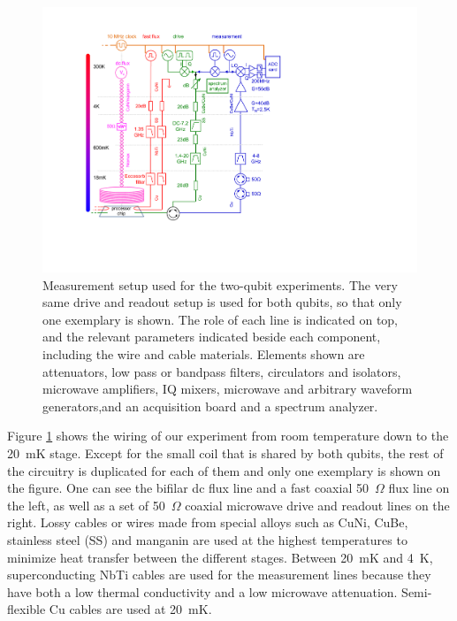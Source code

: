 \begin{figure}[ht!]
	\centering
		\includegraphics[width=1.\textwidth]{"./material/figures/2-qubit-processor/measurement setup"}
	\caption[The measurement setup used for the two-qubit experiments]{Measurement setup used for the two-qubit experiments. The very same drive and readout setup is used for both qubits, so that only one exemplary is shown. The role of each line is indicated on top, and  the relevant parameters indicated beside each component, including the wire and cable materials. Elements shown are attenuators, low pass or bandpass filters, circulators and isolators, microwave amplifiers, IQ mixers, microwave and arbitrary waveform generators,and an acquisition board and a spectrum analyzer. }
	\label{fig:measurement_setup}
\end{figure}

Figure \ref{fig:measurement_setup} shows the wiring of our experiment from room temperature down to the 20~mK stage. Except for the small coil that is shared by both qubits, the rest of the circuitry is duplicated for each of them and only one exemplary is shown on the figure. One can see the bifilar dc flux line and a fast coaxial 50~$\Omega$ flux line on the left, as well as a set of 50~$\Omega$ coaxial microwave drive and readout lines on the right. Lossy cables or wires made from special alloys such as CuNi, CuBe, stainless steel (SS) and manganin are used at the highest temperatures to minimize heat transfer between the different stages. Between 20~mK and 4~K, superconducting NbTi cables are used for the measurement lines because they have both a low thermal conductivity and a low microwave attenuation. Semi-flexible Cu cables are used at 20~mK.

